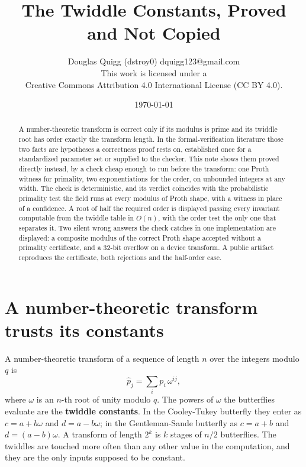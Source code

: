 \documentclass{article}
\title{The Twiddle Constants, Proved and Not Copied}
\author{Douglas Quigg (dstroy0) \small dquigg123@gmail.com \\
\small This work is licensed under a \\
\small Creative Commons Attribution 4.0 International License (CC BY 4.0).
\small \date{\today}}
\begin{document}
\maketitle

\begin{abstract}
A number-theoretic transform is correct only if its modulus is prime and its twiddle root has order exactly the transform length. In the formal-verification literature those two facts are hypotheses a correctness proof rests on, established once for a standardized parameter set or supplied to the checker. This note shows them proved directly instead, by a check cheap enough to run before the transform: one Proth witness for primality, two exponentiations for the order, on unbounded integers at any width. The check is deterministic, and its verdict coincides with the probabilistic primality test the field runs at every modulus of Proth shape, with a witness in place of a confidence. A root of half the required order is displayed passing every invariant computable from the twiddle table in \(O(n)\), with the order test the only one that separates it. Two silent wrong answers the check catches in one implementation are displayed: a composite modulus of the correct Proth shape accepted without a primality certificate, and a 32-bit overflow on a device transform. A public artifact reproduces the certificate, both rejections and the half-order case.
\end{abstract}

\section{A number-theoretic transform trusts its constants}

A number-theoretic transform of a sequence of length \(n\) over the integers modulo \(q\) is
\[
\hat{p}_j = \sum_i p_i \, \omega^{ij},
\]
where \(\omega\) is an \(n\)-th root of unity modulo \(q\). The powers of \(\omega\) the butterflies evaluate are the \textbf{twiddle constants}. In the Cooley-Tukey butterfly they enter as \(c = a + b\omega\) and \(d = a - b\omega\); in the Gentleman-Sande butterfly as \(c = a + b\) and \(d = (a-b)\omega\). A transform of length \(2^k\) is \(k\) stages of \(n/2\) butterflies. The twiddles are touched more often than any other value in the computation, and they are the only inputs supposed to be constant.
\end{document}
